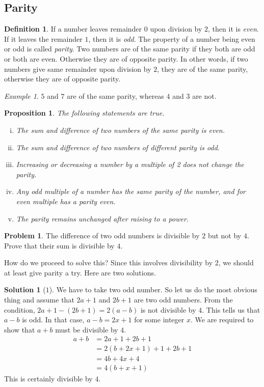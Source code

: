 \documentclass[a4paper, leqno]{article}
\newtheorem{proposition}{Proposition}
\theoremstyle{definition}
\newtheorem{definition}{Definition}
\newtheorem{problem}{Problem}
\newtheorem*{solution}{Solution}
\theoremstyle{remark}
\newtheorem*{example}{Example}
\begin{document}
	\subsection{Parity}
		\begin{definition}
			If a number leaves remainder $0$ upon division by $2$, then it is \textit{even}. If it leaves the remainder $1$, then it is  \textit{odd}. The property of a number being even or odd is called \textit{parity}. Two numbers are of the same parity if they both are odd or both are even. Otherwise they are of opposite parity. In other words, if two numbers give same remainder upon division by $2$, they are of the same parity, otherwise they are of opposite parity.
		\end{definition}
		
		\begin{example}
			$5$ and $7$ are of the same parity, whereas $4$ and $3$ are not.
		\end{example}
		
		\begin{proposition}
			The following statements are true.
				\begin{enumerate}[i.]
					\item The sum and difference of two numbers of the same parity is even.
					\item The sum and difference of two numbers of different parity is odd.
					\item Increasing or decreasing a number by a multiple of 2 does not change
					the parity.
					\item Any odd multiple of a number has the same parity of the number, and
					for even multiple has a parity even.
					\item The parity remains unchanged after raising to a power.
				\end{enumerate}
		\end{proposition}
		
		\begin{problem}
			The difference of two odd numbers is divisible by $2$ but not by $4$. Prove
			that their sum is divisible by $4$.
		\end{problem}
	How do we proceed to solve this? Since this involves divisibility by $2$, we should at least give parity a try. Here are two solutions.
		\begin{solution}[$1$]
			We have to take two odd number. So let us do the most obvious thing and assume that $2a+1$ and $2b+1$ are two odd numbers. From the condition, $2a+1-(2b+1)=2(a-b)$ is not divisible by $4$. This tells us that $a-b$ is odd. In that case, $a-b=2x+1$ for some integer $x$. We are required to show that $a+b$ must be divisible by $4$.
				\begin{align*}
					a+b & =2a+1+2b+1\\
						& = 2(b+2x+1)+1+2b+1\\
						& = 4b+4x+4\\
						& = 4(b+x+1)
				\end{align*}
			This is certainly divisible by $4$.
		\end{solution}
	
\end{document}
